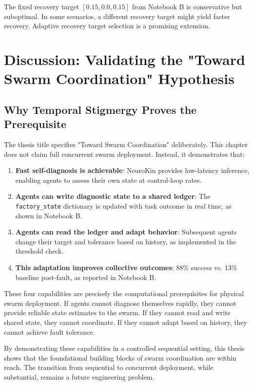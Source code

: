 \documentclass[12pt,a4paper,oneside]{report}
\begin{document}
The fixed recovery target $[0.15, 0.0, 0.15]$ from Notebook B is conservative but suboptimal. In some scenarios, a different recovery target might yield faster recovery. Adaptive recovery target selection is a promising extension.

\section{Discussion: Validating the "Toward Swarm Coordination" Hypothesis}

\subsection{Why Temporal Stigmergy Proves the Prerequisite}

The thesis title specifies "Toward Swarm Coordination" deliberately. This chapter does not claim full concurrent swarm deployment. Instead, it demonstrates that:

\begin{enumerate}
    \item \textbf{Fast self-diagnosis is achievable}: NeuroKin provides low-latency inference, enabling agents to assess their own state at control-loop rates.
    \item \textbf{Agents can write diagnostic state to a shared ledger}: The \texttt{factory\_state} dictionary is updated with task outcome in real time, as shown in Notebook B.
    \item \textbf{Agents can read the ledger and adapt behavior}: Subsequent agents change their target and tolerance based on history, as implemented in the threshold check.
    \item \textbf{This adaptation improves collective outcomes}: 88\% success vs. 13\% baseline post-fault, as reported in Notebook B.
\end{enumerate}

These four capabilities are precisely the computational prerequisites for physical swarm deployment. If agents cannot diagnose themselves rapidly, they cannot provide reliable state estimates to the swarm. If they cannot read and write shared state, they cannot coordinate. If they cannot adapt based on history, they cannot achieve fault tolerance.

By demonstrating these capabilities in a controlled sequential setting, this thesis shows that the foundational building blocks of swarm coordination are within reach. The transition from sequential to concurrent deployment, while substantial, remains a future engineering problem.
\end{document}
